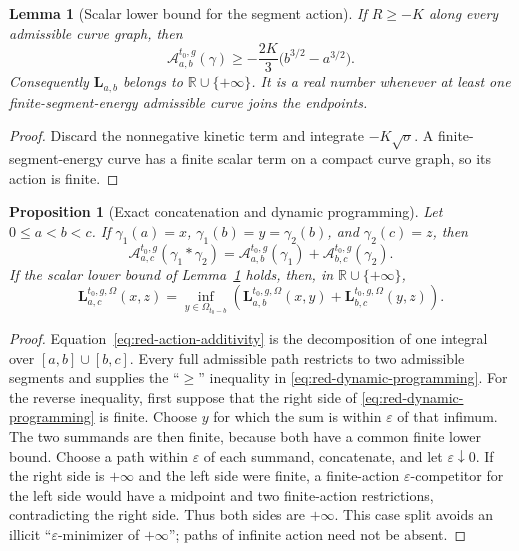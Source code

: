 \documentclass[10pt]{coll-l}
\newtheorem{lemma}[theorem]{Lemma}
\newtheorem{proposition}[theorem]{Proposition}
\theoremstyle{definition}
\theoremstyle{remark}
\numberwithin{section}{chapter}
\numberwithin{equation}{chapter}
\begin{document}
\begin{lemma}[Scalar lower bound for the segment action]
\label{lem:red-action-lower-bound}
If $R\geq-K$ along every admissible curve graph, then
\begin{equation}
 \mathcal A^{t_0,g}_{a,b}(\gamma)
 \geq-\frac{2K}{3}\bigl(b^{3/2}-a^{3/2}\bigr).          \label{eq:red-action-scalar-lower}
\end{equation}
Consequently $\mathbf L_{a,b}$ belongs to
$\mathbb R\cup\{+\infty\}$.  It is a real number whenever at least one
finite-segment-energy admissible curve joins the endpoints.
\end{lemma}

\begin{proof}
Discard the nonnegative kinetic term and integrate
$-K\sqrt\sigma$.  A finite-segment-energy curve has a finite scalar term on a
compact curve graph, so its action is finite.
\end{proof}

\begin{proposition}[Exact concatenation and dynamic programming]
\label{prop:red-dynamic-programming}
Let $0\leq a<b<c$.  If $\gamma_1(a)=x$, $\gamma_1(b)=y=\gamma_2(b)$, and
$\gamma_2(c)=z$, then
\begin{equation}
 \mathcal A^{t_0,g}_{a,c}(\gamma_1*\gamma_2)
 =\mathcal A^{t_0,g}_{a,b}(\gamma_1)
  +\mathcal A^{t_0,g}_{b,c}(\gamma_2).                  \label{eq:red-action-additivity}
\end{equation}
If the scalar lower bound of Lemma~\ref{lem:red-action-lower-bound} holds,
then, in $\mathbb R\cup\{+\infty\}$,
\begin{equation}
 \mathbf L^{t_0,g,\Omega}_{a,c}(x,z)
 =\inf_{y\in\Omega_{t_0-b}}
   \left(\mathbf L^{t_0,g,\Omega}_{a,b}(x,y)
        +\mathbf L^{t_0,g,\Omega}_{b,c}(y,z)\right).    \label{eq:red-dynamic-programming}
\end{equation}
\end{proposition}

\begin{proof}
Equation~\eqref{eq:red-action-additivity} is the decomposition of one
integral over $[a,b]\cup[b,c]$.  Every full admissible path restricts to
two admissible segments and supplies the ``$\geq$'' inequality in
\eqref{eq:red-dynamic-programming}.  For the reverse inequality, first
suppose that the right side of \eqref{eq:red-dynamic-programming} is finite.
Choose $y$ for which the sum is within $\varepsilon$ of that infimum.  The
two summands are then finite, because both have a common finite lower bound.
Choose a path within $\varepsilon$ of each summand, concatenate, and let
$\varepsilon\downarrow0$.  If the right side is $+\infty$ and the left side
were finite, a finite-action $\varepsilon$-competitor for the left side
would have a midpoint and two finite-action restrictions, contradicting the
right side.  Thus both sides are $+\infty$.  This case split avoids an
illicit ``$\varepsilon$-minimizer of $+\infty$''; paths of infinite action
need not be absent.
\end{proof}
\end{document}

